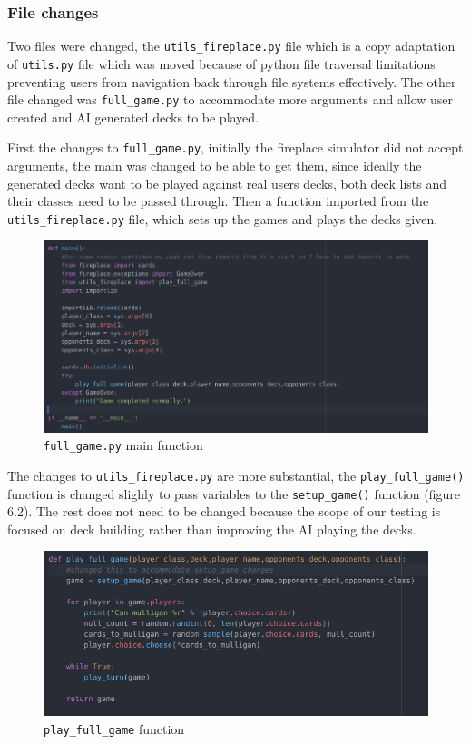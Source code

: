 \documentclass{report} %
\begin{document}
\subsubsection{File changes}
Two files were changed, the \nolinkurl{utils_fireplace.py} file which is a copy adaptation of \nolinkurl{utils.py} file which was moved because of python file traversal limitations preventing users from navigation back through file systems effectively. The other file changed was \nolinkurl{full_game.py} to accommodate more arguments and allow user created and AI generated decks to be played.

First the changes to \nolinkurl{full_game.py}, initially the fireplace simulator did not accept arguments, the main was changed to be able to get them, since ideally the generated decks want to be played against real users decks, both deck lists and their classes need to be passed through. Then a function imported from the \nolinkurl{utils_fireplace.py} file, which sets up the games and plays the decks given. 

\begin{figure}[H]
\centering
\includegraphics[width=1.25\textwidth]{simMain}
\caption{\nolinkurl{full_game.py} main function \protect}
 \label{board}
\end{figure}

The changes to \nolinkurl{utils_fireplace.py} are more substantial, the \nolinkurl{play_full_game()} function is changed slighly to pass variables to the \nolinkurl{setup_game()} function (figure 6.2). The rest does not need to be changed because the scope of our testing is focused on deck building rather than improving the AI playing the decks. 

\begin{figure}[H]
\centering
\includegraphics[width=1.25\textwidth]{playFullGame}
\caption{\nolinkurl{play_full_game} function \protect}
 \label{board}
\end{figure}
\end{document}
